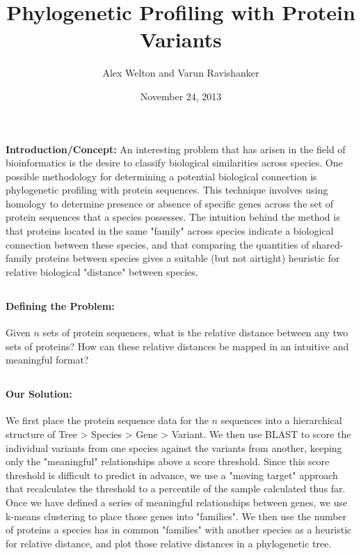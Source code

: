 \documentclass[11pt, oneside]{article}
\title{Phylogenetic Profiling with Protein Variants}
\author{Alex Welton and Varun Ravishanker}
\date{November 24, 2013}
\begin{document}
\maketitle

\pagebreak
\section{}
{\bfseries Introduction/Concept:} An interesting problem that has arisen in the field of bioinformatics is the desire to classify biological similarities across species. One possible methodology for determining a potential biological connection is phylogenetic profiling with protein sequences. This technique involves using homology to determine presence or absence of specific genes across the set of protein sequences that a species possesses. The intuition behind the method is that proteins located in the same "family" across species indicate a biological connection between these species, and that comparing the quantities of shared-family proteins between species gives a suitable (but not airtight) heuristic for relative biological "distance" between species.

\subsection{}
\paragraph
{\bfseries Defining the Problem:} Given $n$ sets of protein sequences, what is the relative distance between any two sets of proteins? How can these relative distances be mapped in an intuitive and meaningful format?

\subsection{}
\paragraph
{\bfseries Our Solution:} We first place the protein sequence data for the $n$ sequences into a hierarchical structure of Tree > Species > Gene > Variant. We then use BLAST to score the individual variants from one species against the variants from another, keeping only the "meaningful" relationships above a score threshold. Since this score threshold is difficult to predict in advance, we use a "moving target" approach that recalculates the threshold to a percentile of the sample calculated thus far. Once we have defined a series of meaningful relationships between genes, we use k-means clustering to place those genes into "families". We then use the number of proteins a species has in common "families" with another species as a heuristic for relative distance, and plot those relative distances in a phylogenetic tree.
\end{document}
